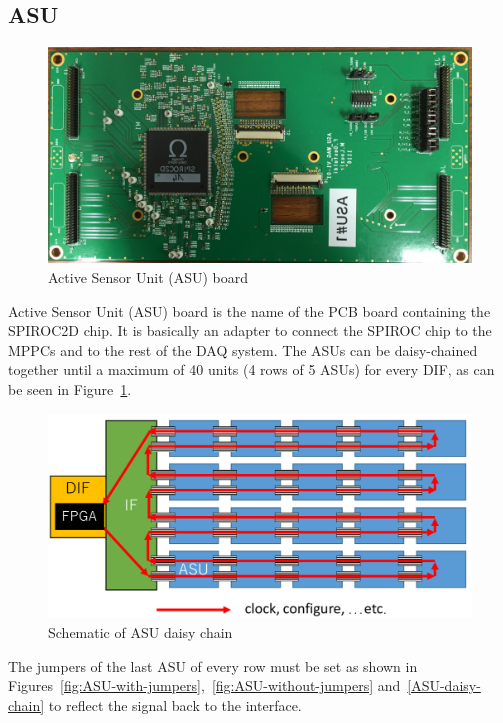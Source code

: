 \subsection{ASU}\label{sec:ASU}
\begin{figure}[H]
  \centering \includegraphics[width=0.8\linewidth, frame]{ASU}
  \caption{Active Sensor Unit (ASU) board}
\end{figure}
Active Sensor Unit (ASU) board is the name of the PCB board containing the
SPIROC2D chip. It is basically an adapter to connect the SPIROC chip to the
MPPCs and to the rest of the DAQ system. The ASUs can be daisy-chained together
until a maximum of 40 units (4 rows of 5 ASUs) for every DIF, as can be seen in
Figure~\ref{daisy-chain}.
\begin{figure}[H]
  \centering \includegraphics[width=0.7\linewidth]{daisy-chain}
  \caption{Schematic of ASU daisy chain}\label{daisy-chain}
\end{figure}
The jumpers of the last ASU of every row must be set as shown in
Figures~\ref{fig:ASU-with-jumpers},~\ref{fig:ASU-without-jumpers}
and~\ref{ASU-daisy-chain} to reflect the signal back to the interface.
